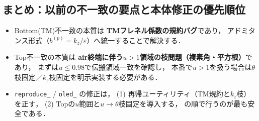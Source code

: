 \subsection{まとめ：以前の不一致の要点と本体修正の優先順位}

\begin{itemize}
\item Bottom(TM)不一致の本質は \textbf{TMフレネル係数の規約バグ}であり，
      アドミタンス形式（$b^{(p)}=k_z/\varepsilon$）へ統一することで解決する．
\item Top不一致の本質は \textbf{air終端に伴う$u>1$領域の枝問題（複素角・平方根）}であり，
      まずは$u\le 0.98$で伝搬領域一致を確認し，
      本番で$u>1$を扱う場合は$\theta$枝固定／$k_z$枝固定を明示実装する必要がある．
\item \texttt{reproduce\_\*\*} / \texttt{oled\_\*\*} の修正は，
      (1) 再帰ユーティリティ（TM規約と$k_z$枝）を正す，
      (2) Topの$u$範囲と$u\to\theta$枝固定を導入する，
      の順で行うのが最も安全である．
\end{itemize}
